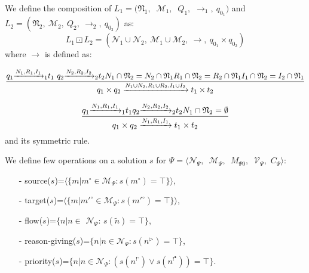 \begin{definition}
\label{def:composition}
We define the composition of $L_1=(\mathfrak{N}_1,$ $\ \mathcal{M}_1,\ $ $ Q_{1},$ $\rightarrow_1,\ q_{0_1})$ and $L_2=(\mathfrak{N}_2,\  \mathcal{M}_2,\ Q_{2},\ \rightarrow_2,\ q_{0_2})$ as:
$$L_1\boxdot L_2=(\mathcal{N}_1\cup \mathcal{N}_2,\ \mathcal{M}_1 \cup \mathcal{M}_2,\ \rightarrow,\  q_{0_1}\times q_{0_2})$$ where $\rightarrow$ is defined as:

\begin{flushleft}{
$$\frac{\longtransitionno{q_1}{N_1,R_1,I_1}{1}{t_1}\ \longtransitionno{q_2}{N_2,R_2,I_2}{2}{t_2}N_1\cap\mathfrak{N}_2=N_2\cap \mathfrak{N}_1 R_1\cap\mathfrak{N}_2=R_2\cap \mathfrak{N}_1 I_1\cap\mathfrak{N}_2=I_2\cap \mathfrak{N}_1
%
%
}{\longtransition{q_1\times q_2}{N_1 \cup N_2,R_1\cup R_2,I_1\cup I_2}{t_1\times t_2}}$$}
\end{flushleft}

\begin{flushleft}{
$$\frac{q_1{\xrightarrow{N_1,R_1,I_1}_{1}}t_1 q_2{\xrightarrow{N_2,R_2,I_2}_{2}}t_2N_1 \cap \mathfrak{N}_2=\emptyset}{q_1\times q_2\xrightarrow{N_1,R_1,I_1}t_1 \times t_2}$$
\normalsize
and its symmetric rule.}\end{flushleft}%
\end{definition}

We define few operations on a solution $s$ for $\Psi=\langle$$\mathcal{N}_{\Psi},$\ $\mathcal{M}_{\Psi},$\ $M_{\Psi 0},\ $ $\mathcal{V}_{\Psi},$ $C_{\Psi}$$\rangle$:
\begin{itemize}
 \item[-] source($s$)=$\langle\{m|$$m^\circ$$\in\mathcal{M}_{\Psi}: s(m^\circ)=\top\}\rangle$,
 \item[-]
target($s$)=$\langle$$\{m|$$m'^\circ$$\in\mathcal{M}_{\Psi} : $$s(m'^\circ)$$=\top\}\rangle$, 
\item[-] flow($s$)=$\{n|n$$\in$ $\mathcal{N}_{\Psi}$: $s(\tilde{n})=\top\}$,
\item[-] reason-giving($s$)=$\{n|n$$\in$$\mathcal{N}_{\Psi}: $$s(n^\triangleright)$$=\top\}$, 
\item[-] priority($s$)=$\{n|n\in\mathcal{N}_{\Psi}:  (s(n^{!^\circ}) \vee s(n^{!^\bullet}))=\top\}$. 
\end{itemize}

